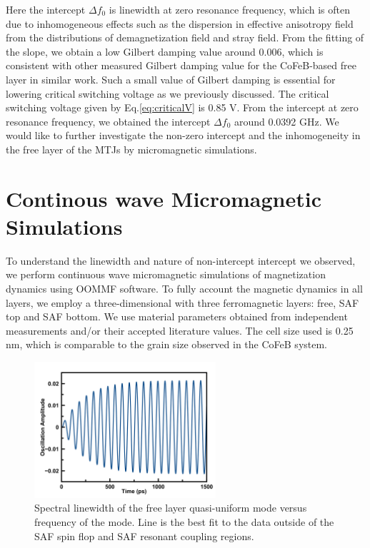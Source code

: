 Here the intercept $\Delta f_0$ is linewidth at zero resonance frequency, which is often due to inhomogeneous effects such as the dispersion in effective anisotropy field from the distributions of demagnetization field and stray field\cite{inhom}. From the fitting of the slope, we obtain a low Gilbert damping value around 0.006, which is consistent with other measured Gilbert damping value for the CoFeB-based free layer in similar work\cite{STFMR_1}. Such a small value of Gilbert damping is essential for lowering critical switching voltage as we previously discussed. The critical switching voltage given by Eq.\ref{eq:criticalV} is 0.85 V. From the intercept at zero resonance frequency, we obtained the intercept $\Delta f_0$ around 0.0392 GHz. We would like to further investigate the non-zero intercept and the inhomogeneity in the free layer of the MTJs by micromagnetic simulations.








\section{Continous wave Micromagnetic Simulations}

To understand the linewidth and nature of non-intercept intercept we observed, we perform continuous wave micromagnetic simulations of magnetization dynamics using OOMMF software\cite{OOMMF}. To fully account the magnetic dynamics in all layers, we employ a three-dimensional with three ferromagnetic layers: free, SAF top and SAF bottom. We use material parameters obtained from independent measurements and/or their accepted literature values. The cell size used is 0.25 nm, which is comparable to the grain size observed in the CoFeB system\cite{grain}. 

\begin{figure}[h]
  \centering
  \includegraphics[width=0.6\textwidth]{fig/Time_oscillation.png}
  \caption{Spectral linewidth of the free layer quasi-uniform mode versus frequency of the mode. Line is the best fit to the data outside of the SAF spin flop and SAF resonant coupling regions.}
  \label{fig:timeOscilation}
\end{figure}

